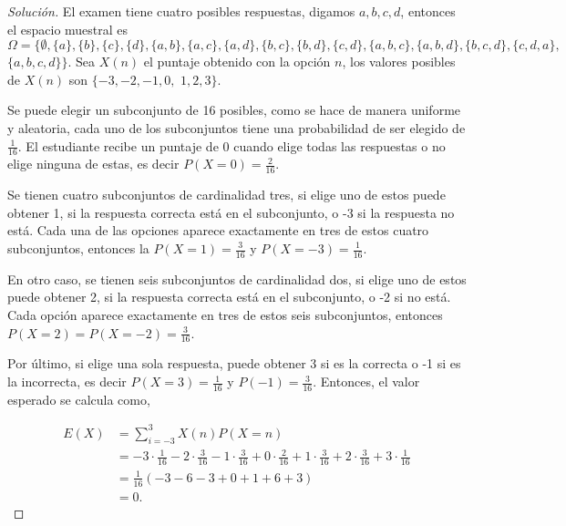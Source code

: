 \documentclass[12pt,letterpaper]{article}
\begin{document}
\begin{proof}[Solución] 
El examen tiene cuatro posibles respuestas, digamos $a,b,c,d$, entonces el espacio muestral es $\Omega = \{\emptyset, \{a\}, \{b\},\{c\}, \{d\}, \{a,b\}, \{a,c\}, \{a,d\}, \{b,c\}, \{b,d\}, \{c,d\}, \{a,b,c\}, \{a,b,d\}, \{b,c,d\}, \{c,d,a\},$ $\{a,b,c,d\}\}$. Sea $X(n)$ el puntaje obtenido con la opción $n$, los valores posibles de $X(n)$ son $\{-3,-2,-1,0,$ $1,2,3\}$.

Se puede elegir un subconjunto de 16 posibles,  como se hace de manera uniforme y aleatoria, cada uno de los subconjuntos tiene una probabilidad de ser elegido de $\frac{1}{16}$. El estudiante recibe un puntaje de 0 cuando elige todas las respuestas o no elige ninguna de estas, es decir $P(X=0)=\frac{2}{16}$.

Se tienen cuatro subconjuntos de cardinalidad tres, si elige uno de estos puede obtener 1, si la respuesta correcta está en el subconjunto, o -3 si la respuesta no está. Cada una de las opciones aparece exactamente en tres de estos cuatro subconjuntos, entonces la $P(X=1)=\frac{3}{16}$ y $P(X=-3)=\frac{1}{16}$.

En otro caso, se tienen seis subconjuntos de cardinalidad dos, si elige uno de estos puede obtener 2, si la respuesta correcta está en el subconjunto, o -2 si no está. Cada opción aparece exactamente en tres de estos seis subconjuntos, entonces $P(X=2)=P(X=-2)=\frac{3}{16}$.

Por último, si elige una sola respuesta, puede obtener 3 si es la correcta o -1 si es la incorrecta, es decir $P(X=3)=\frac{1}{16}$ y $P(-1)=\frac{3}{16}$. Entonces, el valor esperado se calcula como,

\begin{align}
E(X) &= \sum_{i=-3}^3 X(n)P(X=n) \\ &= -3 \cdot \frac{1}{16} -2 \cdot \frac{3}{16} -1\cdot\frac{3}{16} + 0 \cdot\frac{2}{16} + 1\cdot \frac{3}{16} + 2 \cdot \frac{3}{16} + 3\cdot\frac{1}{16} \\ &= \frac{1}{16} (-3-6-3+0+1+6+3) \\ &=0.
\end{align}
\end{proof}
\end{document}
